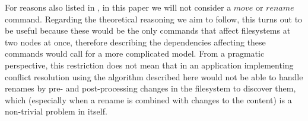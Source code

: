 
For reasons also listed in \cite{NREC}, in this paper we will not consider
a $move$ or $rename$ command. Regarding the theoretical reasoning we aim to follow,
this turns out to be useful because these would be the only commands that affect
filesystems at two nodes at once, therefore describing 
the dependencies affecting these commands
would call for a more complicated model.
From a pragmatic perspective, this restriction does not mean that in an application
implementing conflict resolution using the algorithm described here would not be
able to handle renames by pre- and post-processing changes in the filesystem to
discover them, which (especially when a rename is combined with changes to the content)
is a non-trivial problem in itself.
